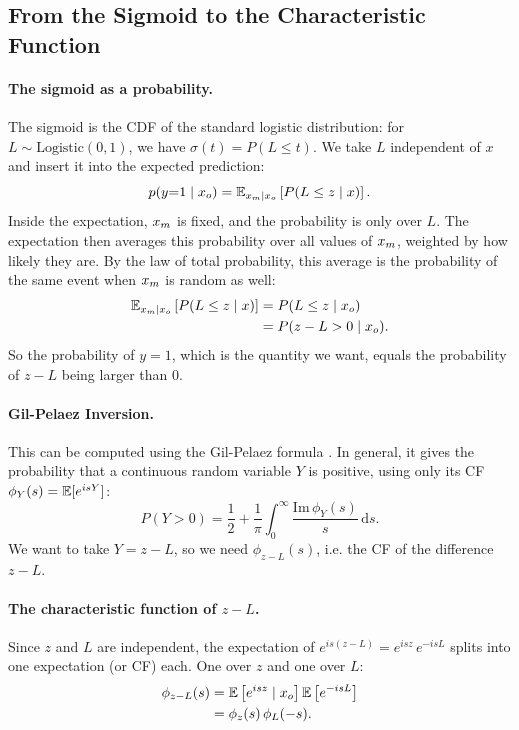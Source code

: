 \subsection{From the Sigmoid to the Characteristic Function}
\label{sec:cfi-derivation}

\paragraph{The sigmoid as a probability.}
The sigmoid is the CDF of the standard logistic distribution: for $L \sim \mathrm{Logistic}(0, 1)$, we have $\sigma(t) = P(L \leq t)$.
We take $L$ independent of $x$ and insert it into the expected prediction:
\[
  p(y{=}1 \mid x_o) = \mathbb{E}_{x_m \mid x_o}\left[ P(L \leq z \mid x) \right].
\]
Inside the expectation, $x_m$ is fixed, and the probability is only over $L$.
The expectation then averages this probability over all values of $x_m$, weighted by how likely they are.
By the law of total probability, this average is the probability of the same event when $x_m$ is random as well:
\begin{align*}
  \mathbb{E}_{x_m \mid x_o}\left[ P(L \leq z \mid x) \right] &= P(L \leq z \mid x_o) \\
  &= P(z - L > 0 \mid x_o).
\end{align*}
So the probability of $y = 1$, which is the quantity we want, equals the probability of $z - L$ being larger than $0$.

\paragraph{Gil-Pelaez Inversion.}
This can be computed using the Gil-Pelaez formula \citep{gilpelaez1951}. In general, it gives the probability that a continuous random variable $Y$ is positive, using only its CF $\phi_Y(s) = \mathbb{E}[e^{isY}]$:
\[
  P(Y > 0) = \frac{1}{2} + \frac{1}{\pi} \int_0^\infty \frac{\mathrm{Im}\, \phi_Y(s)}{s} \, \mathrm{d}s.
\]
We want to take $Y = z - L$, so we need $\phi_{z - L}(s)$, i.e. the CF of the difference $z - L$. 

\paragraph{The characteristic function of $z-L$.}
Since $z$ and $L$ are independent, 
the expectation of $e^{is(z - L)} = e^{isz}\, e^{-isL}$ splits into one expectation (or CF) each. One over $z$ and one over $L$:
\begin{align}
  \phi_{z - L}(s) &= \mathbb{E}\left[ e^{isz} \mid x_o \right] \mathbb{E}\left[ e^{-isL} \right] \notag \\
  &= \phi_z(s)\, \phi_L(-s).
  \label{eq:cf-diff}
\end{align}

